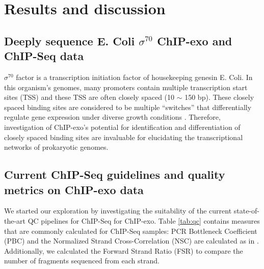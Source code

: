 \documentclass{bmcart}\usepackage[]{graphicx}\usepackage[]{color}
\newcommand{\sig}{\sigma^{70}}
\begin{document}
\section{Results and discussion}
\label{sec:results}

\subsection{Deeply sequence E. Coli $\sig$ ChIP-exo and ChIP-Seq data}
 
$\sig$ factor is a transcription initiation factor of housekeeping
genesin E. Coli. In this organism's genomes, many promoters contain
multiple transcription start sites (TSS) and these TSS are often
closely spaced (10 $\sim$ 150 bp). These closely spaced binding sites
are considered to be multiple ``switches'' that differentially
regulate gene expression under diverse growth conditions
\cite{regulondb}. Therefore, investigation of ChIP-exo's potential for
identification and differentiation of closely spaced binding sites are
invaluable for elucidating the transcriptional networks of prokaryotic
genomes.

\subsection{Current ChIP-Seq guidelines and quality metrics on ChIP-exo data}

We started our exploration by investigating the suitability of the
current state-of-the-art QC pipelines for ChIP-Seq for ChIP-exo. Table
\ref{tab:qc} contains measures that are commonly calculated for
ChIP-Seq samples: PCR Bottleneck Coefficient (PBC) and the Normalized
Strand Cross-Correlation (NSC) are calculated as in \cite{encode_qc}.
Additionally, we calculated the Forward Strand Ratio (FSR) to compare
the number of fragments sequenced from each strand.

\end{document}
